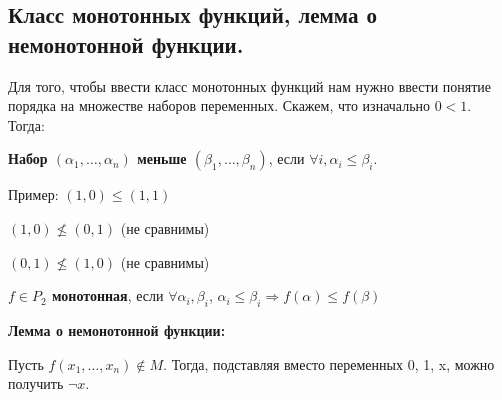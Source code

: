 \subsection{Класс монотонных функций, лемма о немонотонной функции.}

   Для того, чтобы ввести класс монотонных функций нам нужно ввести понятие порядка на множестве наборов переменных. Скажем, что изначально $0 < 1$. Тогда:

   \textbf{Набор $(\alpha_1, \ldots, \alpha_n)$ меньше $(\beta_1, \ldots, \beta_n)$}, если $\forall i, \alpha_i \le \beta_i$.

   Пример: $(1, 0) \le (1, 1)$

   $(1, 0) \nleq (0, 1)$ (не сравнимы)

   $(0, 1) \nleq (1, 0)$ (не сравнимы)

   \textbf{$f \in P_2$ монотонная}, если $\forall \alpha_i, \beta_i$, $\alpha_i \le \beta_i \Rightarrow f(\alpha) \le f(\beta)$

    \textbf{Лемма о немонотонной функции:}

   Пусть $f (x_1, \ldots, x_n) \notin M$. Тогда, подставляя вместо переменных 0, 1, x, можно получить $\neg x$.
